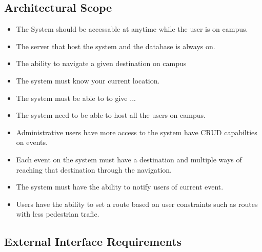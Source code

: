 \documentclass[a4paper,12pt]{report}
\begin{document}
\subsection{Architectural Scope}
\begin{itemize}
	\item The System should be accessable at anytime while the user is on campus.
	\item The server that host the system and the database is always on.
	\item The ability to navigate a given destination on campus
	\item The system must know your current location.
	\item The system must be able to to give ...
	\item The system need to be able to host all the users on campus.
	\item Administrative users have more access to the system have CRUD capabilties on events.
	\item Each event on the system must have a destination and multiple ways of reaching that destination through the navigation.
	\item The system must have the ability to notify users of current event.
	\item Users have the ability to set a route based on user constraints such as routes with less pedestrian trafic. 
\end{itemize}
\newpage
\subsection{External Interface Requirements}
\end{document}
